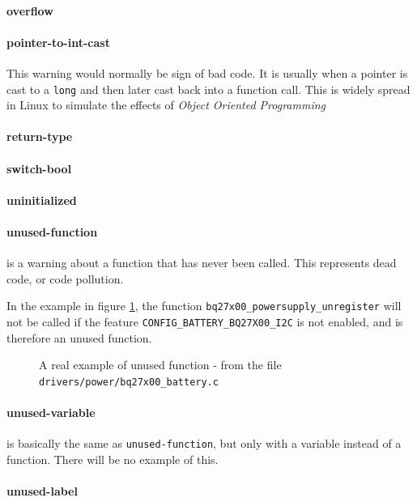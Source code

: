 \documentclass[a4paper,11pt]{report}
\newcommand{\figa}{
    \begin{figure}[!htpb]
    \centering
}
\newcommand{\figb}[2]{
    \caption{#1}
    \label{#2}
    \end{figure}
}
\begin{document}
            \paragraph{overflow}


            \paragraph{pointer-to-int-cast}
            \label{par:pointertoint}
This warning would normally be sign of bad code. It is usually when a pointer 
is cast to a \texttt{long} and then later cast back into a function call. This 
is widely spread in Linux to simulate the effects of \emph{Object Oriented 
Programming}


            \paragraph{return-type}
            \paragraph{switch-bool}
            \paragraph{uninitialized}
            \paragraph{unused-function}
is a warning about a function that has never been called. This represents dead 
code, or code pollution. 

In the example in figure \ref{lst:unusedfuncreal}, the function 
\texttt{bq27x00\_powersupply\_unregister} will not be called if the feature 
\texttt{CONFIG\_BATTERY\_BQ27X00\_I2C} is not enabled, and is therefore an 
unused function.

\figa
    
\figb{A real example of unused function - from the file 
    \texttt{drivers/power/bq27x00\_battery.c}}{lst:unusedfuncreal}


            \paragraph{unused-variable}
is basically the same as \texttt{unused-function}, but only with a variable 
instead of a function. There will be no example of this.


            \paragraph{unused-label}
\end{document}
